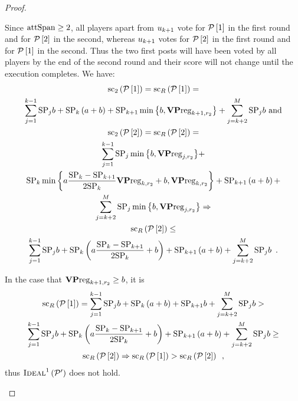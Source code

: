 \begin{proof}
\begin{itemize}
    Since $\mathrm{attSpan} \geq 2$, all players apart from $u_{k + 1}$ vote for
    $\mathcal{P}\left[1\right]$ in the first round and for
    $\mathcal{P}\left[2\right]$ in the second, whereas $u_{k + 1}$ votes for
    $\mathcal{P}\left[2\right]$ in the first round and for
    $\mathcal{P}\left[1\right]$ in the second. Thus the two first posts will have
    been voted by all players by the end of the second round and their score
    will not change until the execution completes. We have:
    \begin{gather*}
      \mathrm{sc}_2\left(\mathcal{P}\left[1\right]\right) =
      \mathrm{sc}_R\left(\mathcal{P}\left[1\right]\right) = \\
      \sum\limits_{j = 1}^{k-1}\mathrm{SP}_j b + \mathrm{SP}_k \left(a + b\right) +
      \mathrm{SP}_{k+1} \min{\left\{b, \mathrm{\textbf{VP}reg}_{k+1,r_2}\right\}} +
      \sum\limits_{j = k + 2}^{M}\mathrm{SP}_j b \text{ and} \\
      \mathrm{sc}_2\left(\mathcal{P}\left[2\right]\right) =
      \mathrm{sc}_R\left(\mathcal{P}\left[2\right]\right) = \\
      \sum\limits_{j = 1}^{k-1}\mathrm{SP}_j \min{\left\{b,
      \mathrm{\textbf{VP}reg}_{j,r_2}\right\}} + \\
      \mathrm{SP}_k \min{\left\{a \frac{\mathrm{SP}_k - \mathrm{SP}_{k+1}}{2\mathrm{SP}_k}
      \mathrm{\textbf{VP}reg}_{k, r_2} + b, \mathrm{\textbf{VP}reg}_{k, r_2}\right\}} + \mathrm{SP}_{k+1}
      \left(a + b\right) + \\
      \sum\limits_{j = k + 2}^{M}\mathrm{SP}_j \min{\left\{b,
      \mathrm{\textbf{VP}reg}_{j, r_2}\right\}} \Rightarrow \\
      \mathrm{sc}_R\left(\mathcal{P}\left[2\right]\right) \leq \\
      \sum\limits_{j = 1}^{k-1}\mathrm{SP}_j b + \mathrm{SP}_k \left(a \frac{\mathrm{SP}_k -
      \mathrm{SP}_{k+1}}{2\mathrm{SP}_k} + b\right) + \mathrm{SP}_{k+1} \left(a + b\right) +
      \sum\limits_{j = k + 2}^{M}\mathrm{SP}_j b \enspace.
    \end{gather*}

    In the case that $\mathrm{\textbf{VP}reg}_{k+1, r_2} \geq b$, it is
    \begin{gather*}
      \mathrm{sc}_R\left(\mathcal{P}\left[1\right]\right) = \sum\limits_{j =
      1}^{k-1}\mathrm{SP}_j b + \mathrm{SP}_k \left(a + b\right) + \mathrm{SP}_{k+1} b +
      \sum\limits_{j = k + 2}^{M}\mathrm{SP}_j b > \\
      \sum\limits_{j = 1}^{k-1}\mathrm{SP}_j b + \mathrm{SP}_k \left(a \frac{\mathrm{SP}_k -
      \mathrm{SP}_{k+1}}{2\mathrm{SP}_k} + b\right) + \mathrm{SP}_{k+1} \left(a + b\right) +
      \sum\limits_{j = k + 2}^{M}\mathrm{SP}_j b \geq \\
      \mathrm{sc}_R\left(\mathcal{P}\left[2\right]\right) \Rightarrow
      \mathrm{sc}_R\left(\mathcal{P}\left[1\right]\right) >
      \mathrm{sc}_R\left(\mathcal{P}\left[2\right]\right) \enspace,
    \end{gather*}
    thus $\textsc{Ideal}^1\left(\mathcal{P}'\right)$ does not hold.


\end{itemize}
\end{proof}

